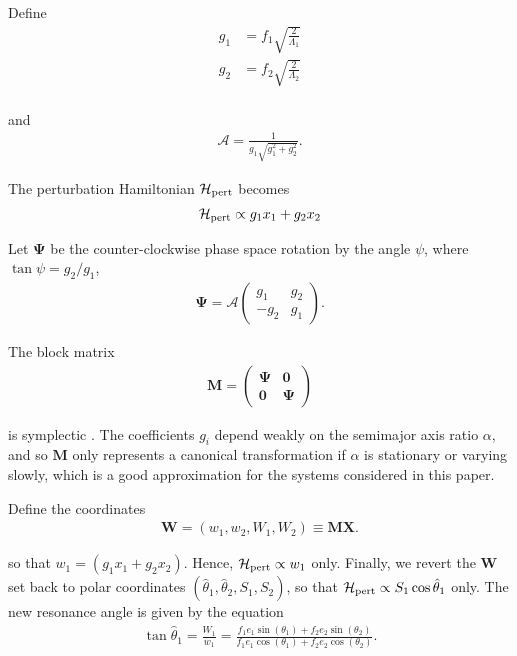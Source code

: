 \documentclass[usenatbib,twocolumn]{mnras}
\renewcommand{\v}[1]{\boldsymbol{ #1 }}
\begin{document}
\noindent 
Define
\begin{align}
    g_1 &= f_1\sqrt{\frac{2}{\Lambda_1}} \\
    g_2 &= f_2\sqrt{\frac{2}{\Lambda_2}} \\
\end{align}

\noindent and
\begin{align}
  \mathcal{A} = \frac{1}{g_1\sqrt{g_1^2+g_2^2}}.
\end{align}

\noindent The perturbation Hamiltonian \(\mathcal H_{\rm
pert}\) becomes
\begin{align}
  \mathcal H_{\rm pert} \propto g_1 x_1 + g_2 x_2
\end{align}

\noindent
Let \(\v \Psi\) be the
counter-clockwise phase space rotation by the angle \(\psi\), where \(\tan\psi=
g_2/g_1\),
\begin{align}
  \v \Psi =  \mathcal{A}
  \begin{pmatrix}
    g_1 & g_2 \\
    -g_2 & g_1 
  \end{pmatrix}.
\end{align}

\noindent The block matrix
\begin{align}
  \v M =
  \begin{pmatrix}
    \v \Psi & \v 0 \\
    \v 0 & \v \Psi
  \end{pmatrix}
\end{align}

\noindent is symplectic \citep{goldstein_classical_2000}.
The coefficients \(g_i\) depend weakly on the semimajor axis ratio
\(\alpha\), and so \(\v M\) only represents a canonical transformation if
\(\alpha\) is stationary or varying slowly, which is a good
approximation for the systems considered in this paper.

Define the coordinates
\begin{align}
   \v W = (w_1, w_2, W_1, W_2) \equiv \v M \v X.
\end{align}

\noindent so that \(w_1 = (g_1 x_1 + g_2 x_2)\).  Hence,
\(\mathcal H_{\rm pert}\propto w_1\) only.  Finally, we revert the \(\v
W\) set back to polar coordinates
\((\hat\theta_1,\hat\theta_2,S_1,S_2)\), so that \(\mathcal H_{\rm pert}\propto S_1\cos\hat\theta_1\)
only.
The new resonance angle is
given by the equation
\begin{align}
\label{hattheta}
  \tan\hat{\theta}_1 = \frac{W_1}{w_1} = \frac{f_1 e_1\sin(\theta_1)
  + f_2e_2\sin(\theta_2)}{f_1e_1\cos(\theta_1) + f_2e_2\cos(\theta_2)}.
\end{align}
\end{document}
